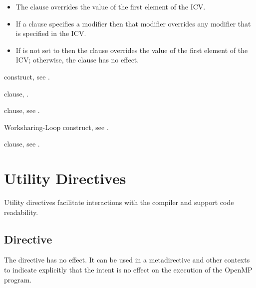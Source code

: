 \linenumbers

\descr
\begin{itemize}
\item The  clause overrides the value of the first element of the
       ICV.
\item If a  clause specifies a modifier then that modifier overrides 
      any modifier that is specified in the  ICV.
\item If  is not set to  then the  clause 
      overrides the value of the first element of the  ICV; otherwise, 
      the  clause has no effect.
\end{itemize}

\begin{crossrefs}
\item {} construct, see
.

\item {} clause,
.

\item {} clause, see
.

\item Worksharing-Loop construct, see
.

\item {} clause, see
.
\end{crossrefs}



\section{Utility Directives}
\label{sec:Utility Directives}

Utility directives facilitate interactions with the compiler 
and support code readability. 



\subsection{ Directive}
\label{subsec:nothing Directive}
\summary
The  directive has no effect. It can be used in a 
metadirective and other contexts to indicate explicitly that the
intent is no effect on the execution of the OpenMP program.

